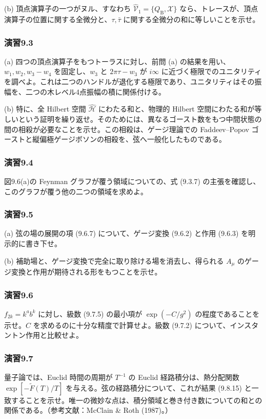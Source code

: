 (b) 頂点演算子の一つがヌル、すなわち $\widehat{\mathcal V}_1=\{Q_{\mathrm B},\mathcal X\}$ なら、トレースが、頂点演算子の位置に関する全微分と、$\tau,\bar\tau$ に関する全微分の和に等しいことを示せ。

\subsubsection*{演習9.3}\label{ex:9.3}
(a) 四つの頂点演算子をもつトーラスに対し、前問 (a) の結果を用い、$w_1,w_2,w_3-w_4$ を固定し、$w_3$ と $2\pi\tau-w_3$ が $i\infty$ に近づく極限でのユニタリティを調べよ。これは二つのハンドルが退化する極限であり、ユニタリティはその振幅を、二つの木レベル4点振幅の積に関係付ける。

(b) 特に、全 Hilbert 空間 $\widehat{\mathcal H}$ にわたる和と、物理的 Hilbert 空間にわたる和が等しいという証明を繰り返せ。そのためには、異なるゴースト数をもつ中間状態の間の相殺が必要なことを示せ。この相殺は、ゲージ理論での Faddeev--Popov ゴーストと縦偏極ゲージボソンの相殺を、弦へ一般化したものである。

\subsubsection*{演習9.4}\label{ex:9.4}
図9.6(a)の Feynman グラフが覆う領域についての、式 (9.3.7) の主張を確認し、このグラフが覆う他の二つの領域を求めよ。

\subsubsection*{演習9.5}\label{ex:9.5}
(a) 弦の場の展開の項 (9.6.7) について、ゲージ変換 (9.6.2) と作用 (9.6.3) を明示的に書き下せ。

(b) 補助場と、ゲージ変換で完全に取り除ける場を消去し、得られる $A_\mu$ のゲージ変換と作用が期待される形をもつことを示せ。

\subsubsection*{演習9.6}\label{ex:9.6}
$f_{2k}=k^ab^k$ に対し、級数 (9.7.5) の最小項が $\exp(-C/g^2)$ の程度であることを示せ。$C$ を求めるのに十分な精度で計算せよ。級数 (9.7.2) について、インスタントン作用と比較せよ。

\subsubsection*{演習9.7}\label{ex:9.7}
量子論では、Euclid 時間の周期が $T^{-1}$ の Euclid 経路積分は、熱分配関数 $\exp[-\widetilde F(T)/T]$ を与える。弦の経路積分について、これが結果 (9.8.15) と一致することを示せ。唯一の微妙な点は、積分領域と巻き付き数についての和との関係である。（参考文献：McClain \& Roth (1987)\cite{McClain:1986id}。）

